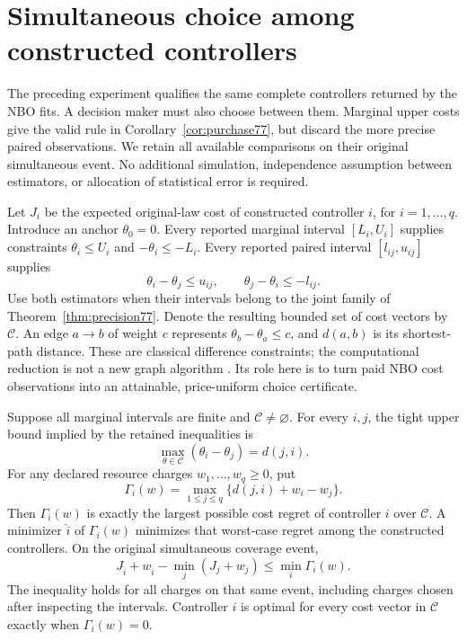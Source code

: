 \section{Simultaneous choice among constructed controllers}\label{sec:choice78}
The preceding experiment qualifies the same complete controllers returned by the NBO fits. A decision maker must also choose between them. Marginal upper costs give the valid rule in Corollary~\ref{cor:purchase77}, but discard the more precise paired observations. We retain all available comparisons on their original simultaneous event. No additional simulation, independence assumption between estimators, or allocation of statistical error is required.

Let $J_i$ be the expected original-law cost of constructed controller $i$, for $i=1,\ldots,q$. Introduce an anchor $\theta_0=0$. Every reported marginal interval $[L_i,U_i]$ supplies constraints $\theta_i\le U_i$ and $-\theta_i\le-L_i$. Every reported paired interval $[l_{ij},u_{ij}]$ supplies
\[
 \theta_i-\theta_j\le u_{ij},\qquad
 \theta_j-\theta_i\le-l_{ij}.
\]
Use both estimators when their intervals belong to the joint family of Theorem~\ref{thm:precision77}. Denote the resulting bounded set of cost vectors by $\mathcal C$. An edge $a\to b$ of weight $c$ represents $\theta_b-\theta_a\le c$, and $d(a,b)$ is its shortest-path distance. These are classical difference constraints; the computational reduction is not a new graph algorithm \citep{floyd1962}. Its role here is to turn paid NBO cost observations into an attainable, price-uniform choice certificate.

\begin{theorem}\label{thm:choice78}
Suppose all marginal intervals are finite and $\mathcal C\ne\varnothing$. For every $i,j$, the tight upper bound implied by the retained inequalities is
\begin{equation}\label{eq:sharp-pair78}
 \max_{\theta\in\mathcal C}(\theta_i-\theta_j)=d(j,i).
\end{equation}
For any declared resource charges $w_1,\ldots,w_q\ge0$, put
\begin{equation}\label{eq:choice-regret78}
 \Gamma_i(w)=\max_{1\le j\le q}\{d(j,i)+w_i-w_j\}.
\end{equation}
Then $\Gamma_i(w)$ is exactly the largest possible cost regret of controller $i$ over $\mathcal C$. A minimizer $\widehat i$ of $\Gamma_i(w)$ minimizes that worst-case regret among the constructed controllers. On the original simultaneous coverage event,
\[
 J_{\widehat i}+w_{\widehat i}-\min_j(J_j+w_j)
       \le\min_i\Gamma_i(w).
\]
The inequality holds for all charges on that same event, including charges chosen after inspecting the intervals. Controller $i$ is optimal for every cost vector in $\mathcal C$ exactly when $\Gamma_i(w)=0$.
\end{theorem}

